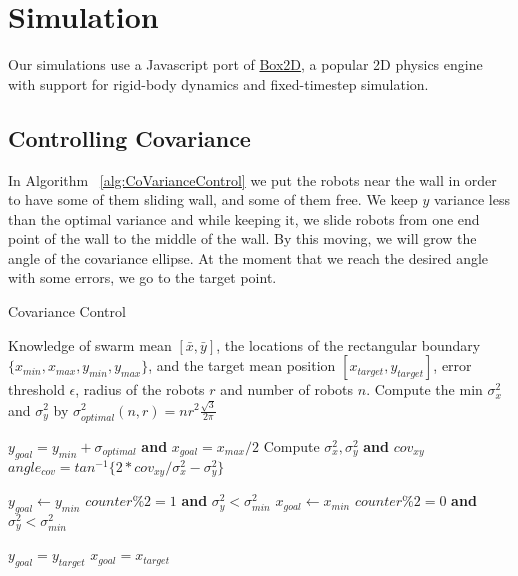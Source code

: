 
\section{Simulation}\label{sec:simulation}

Our simulations use a Javascript port of \href{http://box2d.org/}{Box2D}, a popular 2D physics engine with support for rigid-body dynamics and fixed-timestep simulation. 


\subsection{Controlling Covariance}

In Algorithm ~\ref{alg:CoVarianceControl}  we put the robots near the wall in order to have some of them sliding wall, and some of them free. We keep $y$ variance less than the optimal variance and while keeping it, we slide robots from one end point of the wall to the middle of the wall. By this moving, we will grow the angle of the covariance ellipse. At the moment that we reach the desired angle with some errors, we go to the target point.

\begin{algorithm}
\caption{Covariance Control}\label{alg:CoVarianceControl}
\begin{algorithmic}[1]
\Require Knowledge of swarm mean $[\bar{x},\bar{y}]$, the locations of the rectangular boundary $\{x_{min}, x_{max}, y_{min}, y_{max}\}$, and the target mean position $[x_{target},y_{target}]$, error threshold $\epsilon$, radius of the robots $r$ and number of robots $n$.%
\State Compute the min $\sigma_x^2$ and $\sigma_y^2$ by $ \sigma^2_{optimal}(n,r) = n r^2 \frac{\sqrt{3}}{2 \pi} $

\State $y_{goal} = y_{min} + \sigma_{optimal} $ \textbf{and} $x_{goal} = x_{max}/2$
\Loop
\State  Compute $\sigma_x^2, \sigma_y^2$ \textbf{and} $cov_{xy}$
\State  $angle_{cov} = tan^{-1}\{2*cov_{xy}/\sigma_x^2-\sigma_y^2\}$ 

\State $y_{goal}  \gets y_{min}$
 { $counter \% 2 = 1 $ \textbf{and} $\sigma_y^2 < \sigma_{min}^2$}
\State $x_{goal}  \gets  x_{min}$
 { $counter \% 2 = 0 $ \textbf{and} $\sigma_y^2 < \sigma_{min}^2$}

\EndIf

\State $y_{goal} = y_{target}$
\State $x_{goal} = x_{target}$
\EndIf
\EndLoop
\end{algorithmic}
\end{algorithm}






